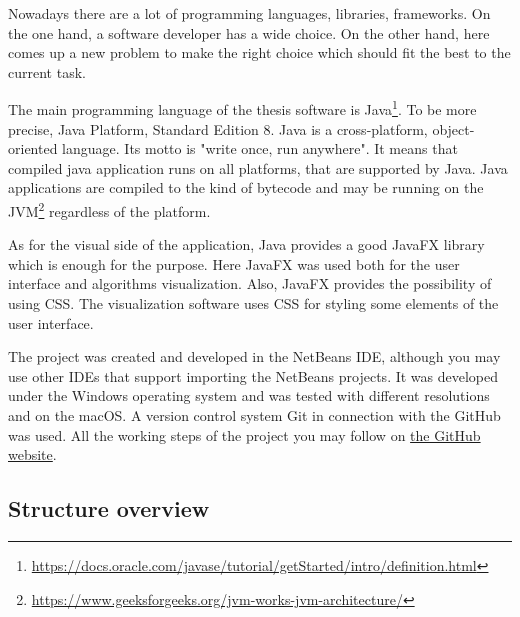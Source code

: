 \documentclass[
  field=inf,
  biblatex,
  language=english,
  glossaries,
  theorems=false,
  sourcecodes=false,
  index
]{kidiplom}
\begin{document}
Nowadays there are a lot of programming languages, libraries, frameworks. On the one hand, a software developer has a wide choice. On the other hand, here comes up a new problem to make the right choice which should fit the best to the current task.

The main programming language of the thesis software is Java\footnote{\url{https://docs.oracle.com/javase/tutorial/getStarted/intro/definition.html}}. To be more precise, Java Platform, Standard Edition 8. Java is a cross-platform, object-oriented language. Its motto is "write once, run anywhere". It means that compiled java application runs on all platforms, that are supported by Java. Java applications are compiled to the kind of bytecode and may be running on the \Gls{JVM}\footnote{\url{https://www.geeksforgeeks.org/jvm-works-jvm-architecture/}} regardless of the platform. 

As for the visual side of the application, Java provides a good JavaFX library which is enough for the purpose. Here JavaFX was used both for the user interface and algorithms visualization. Also, JavaFX provides the possibility of using \Gls{CSS}. The visualization software uses \Gls{CSS} for styling some elements of the user interface.

The project was created and developed in the NetBeans IDE, although you may use other IDEs that support importing the NetBeans projects. It was developed under the Windows operating system and was tested with different resolutions and on the macOS. A version control system Git in connection with the GitHub was used. All the working steps of the project you may follow on \href{https://github.com/klnmi97/Sorting-Visualization}{the GitHub website}.

\newpage
\subsection{Structure overview}
\end{document}
